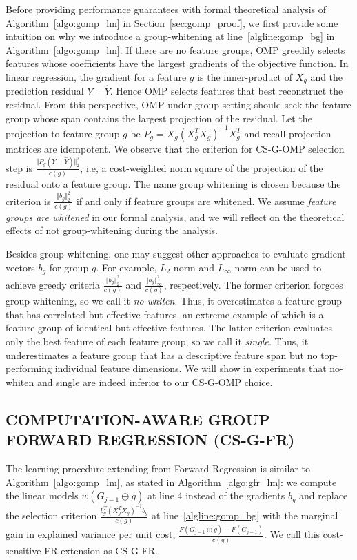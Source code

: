 Before providing performance guarantees with formal theoretical 
analysis of Algorithm~\ref{algo:gomp_lm} in Section~\ref{sec:gomp_proof}, we 
first provide some intuition on why we introduce a group-whitening at 
line~\ref{algline:gomp_bg} in Algorithm~\ref{algo:gomp_lm}.
If there are no feature groups, OMP greedily selects features whose
coefficients have the largest gradients of the objective function. 
In linear regression, the gradient for a feature $g$ 
is the inner-product of $X_g$ and the prediction 
residual $Y-\hat{Y}$. Hence OMP selects features that best reconstruct the 
residual. From this perspective, OMP under group setting 
should seek the feature group whose span contains the largest projection of the residual. 
Let the projection to feature group $g$ be 
$P_g = X_g(X_g^TX_g)^{-1}X_g^T$ and recall projection matrices are
idempotent. We observe that the criterion for CS-G-OMP selection step is
$\frac{\Vert P_g (Y - \hat{Y}) \Vert _2^2 }{c(g)}$, i.e, a cost-weighted
norm square of the projection of the residual onto a feature group. The 
name group whitening is chosen because the criterion is 
$\frac{\Vert b_g \Vert_2^2}{c(g)}$ if and only if feature groups are whitened. 
We assume \textit{feature groups are whitened} in our formal analysis, and we will
reflect on the theoretical effects of not group-whitening during the analysis.

Besides group-whitening, one may suggest other approaches 
to evaluate gradient vectors $b_g$ for group $g$. For example, 
$L_2$ norm and $L_{\infty}$ norm can be used to 
achieve greedy criteria $\frac{\Vert b_g \Vert_2^2}{c(g)}$ and 
$\frac{\Vert b_g \Vert ^2_{\infty}}{c(g)}$, respectively. 
The former criterion forgoes group whitening, so we call it \textit{no-whiten}.
Thus, it overestimates a feature group that has correlated 
but effective features, an extreme example of which is a
feature group of identical but effective features. The latter
criterion evaluates only the best feature of each feature group, so we call it \textit{single}. Thus, it
underestimates a feature group that has a descriptive 
feature span but no top-performing individual feature dimensions.
We will show in experiments that no-whiten and single
are indeed inferior to our CS-G-OMP choice. 


\subsection{COMPUTATION-AWARE GROUP FORWARD REGRESSION (CS-G-FR)} 
The learning procedure extending from Forward Regression is similar to
Algorithm~\ref{algo:gomp_lm}, as stated in Algorithm~\ref{algo:gfr_lm}: we compute the linear models 
$w(G_{j-1} \oplus g)$ at line 4 instead of the 
gradients $b_g$ and replace the selection criterion $\frac{b_g ^T (X_{g}^TX_g)^{-1}b_g}{ c(g) }$ 
at line~\ref{algline:gomp_bg} with the marginal gain in explained 
variance per unit cost, $\frac{F(G_{j-1} \oplus g) - F(G_{j-1}) }{c(g)}$. 
We call this cost-sensitive FR extension as CS-G-FR.


